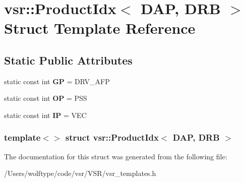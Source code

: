 \hypertarget{structvsr_1_1_product_idx_3_01_d_a_p_00_01_d_r_b_01_4}{\section{vsr\-:\-:Product\-Idx$<$ D\-A\-P, D\-R\-B $>$ Struct Template Reference}
\label{structvsr_1_1_product_idx_3_01_d_a_p_00_01_d_r_b_01_4}
}
\subsection*{Static Public Attributes}
\begin{DoxyCompactItemize}
\item 
\hypertarget{structvsr_1_1_product_idx_3_01_d_a_p_00_01_d_r_b_01_4_ac2ceffc50e129195d558a5d592fa52e9}{static const int {\bfseries G\-P} = D\-R\-V\-\_\-\-A\-F\-P}\label{structvsr_1_1_product_idx_3_01_d_a_p_00_01_d_r_b_01_4_ac2ceffc50e129195d558a5d592fa52e9}

\item 
\hypertarget{structvsr_1_1_product_idx_3_01_d_a_p_00_01_d_r_b_01_4_a35fdf4ae488ce8c98069a148e8226a71}{static const int {\bfseries O\-P} = P\-S\-S}\label{structvsr_1_1_product_idx_3_01_d_a_p_00_01_d_r_b_01_4_a35fdf4ae488ce8c98069a148e8226a71}

\item 
\hypertarget{structvsr_1_1_product_idx_3_01_d_a_p_00_01_d_r_b_01_4_ae3e238cf535e1afa49205b81098823f2}{static const int {\bfseries I\-P} = V\-E\-C}\label{structvsr_1_1_product_idx_3_01_d_a_p_00_01_d_r_b_01_4_ae3e238cf535e1afa49205b81098823f2}

\end{DoxyCompactItemize}
\subsubsection*{template$<$$>$ struct vsr\-::\-Product\-Idx$<$ D\-A\-P, D\-R\-B $>$}



The documentation for this struct was generated from the following file\-:\begin{DoxyCompactItemize}
\item 
/\-Users/wolftype/code/vsr/\-V\-S\-R/vsr\-\_\-templates.\-h\end{DoxyCompactItemize}
